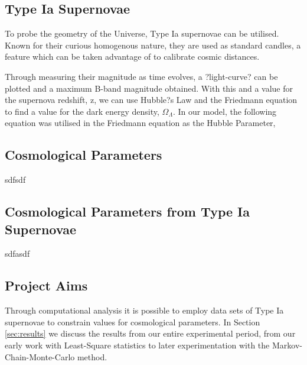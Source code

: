 \documentclass[twocolumn]{revtex4}
\begin{document}
\vspace{-3ex}
\subsection{Type Ia Supernovae}
\vspace{-2ex}

To probe the geometry of the Universe, Type Ia supernovae can be utilised. Known for their curious homogenous nature, they are used as standard candles, a feature which can be taken advantage of to calibrate cosmic distances. 

Through measuring their magnitude as time evolves, a ?light-curve? can be plotted and a maximum B-band magnitude obtained. With this and a value for the supernova redshift, z, we can use Hubble?s Law and the Friedmann equation to find a value for the dark energy density, $\Omega_{\Lambda}$. In our model, the following equation was utilised in the Friedmann equation as the Hubble Parameter,

\vspace{-3ex}
\subsection{Cosmological Parameters}
\vspace{-2ex}

sdfsdf

\vspace{-3ex}
\subsection{Cosmological Parameters from Type Ia Supernovae}
\vspace{-2ex}

sdfasdf

\vspace{-3ex}
\subsection{Project Aims}
\vspace{-2ex}

Through computational analysis it is possible to employ data sets of Type Ia supernovae to constrain values for cosmological parameters. In Section \ref{sec:results} we discuss the results from our entire experimental period, from our early work with Least-Square statistics to later experimentation with the Markov-Chain-Monte-Carlo method. 

\vspace{-3ex}
\end{document}
